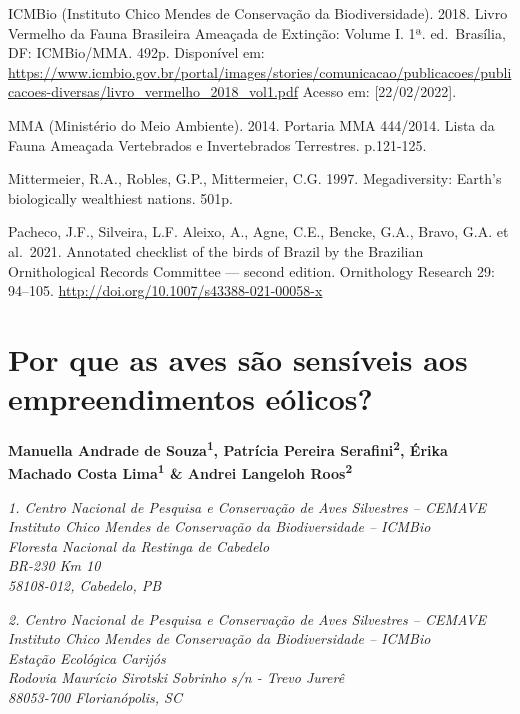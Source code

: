 \documentclass[
  oneside]{scrbook}
\begin{document}
ICMBio (Instituto Chico Mendes de Conservação da Biodiversidade). 2018. Livro Vermelho da Fauna Brasileira Ameaçada de Extinção: Volume I. 1ª. ed.~Brasília, DF: ICMBio/MMA. 492p. Disponível em: \url{https://www.icmbio.gov.br/portal/images/stories/comunicacao/publicacoes/publicacoes-diversas/livro_vermelho_2018_vol1.pdf} Acesso em: {[}22/02/2022{]}.

MMA (Ministério do Meio Ambiente). 2014. Portaria MMA 444/2014. Lista da Fauna Ameaçada Vertebrados e Invertebrados Terrestres. p.121-125.

Mittermeier, R.A., Robles, G.P., Mittermeier, C.G. 1997. Megadiversity: Earth's biologically wealthiest nations. 501p.

Pacheco, J.F., Silveira, L.F. Aleixo, A., Agne, C.E., Bencke, G.A., Bravo, G.A. et al.~2021. Annotated checklist of the birds of Brazil by the Brazilian Ornithological Records Committee --- second edition. Ornithology Research 29: 94--105. \url{http://doi.org/10.1007/s43388-021-00058-x}

\hypertarget{cap4}{%
\chapter{Por que as aves são sensíveis aos empreendimentos eólicos?}\label{cap4}}

\pagestyle{headings}

\textbf{Manuella Andrade de Souza\textsuperscript{1}, Patrícia Pereira Serafini\textsuperscript{2}, Érika Machado Costa Lima\textsuperscript{1} \& Andrei Langeloh Roos\textsuperscript{2}}

\emph{1. Centro Nacional de Pesquisa e Conservação de Aves Silvestres -- CEMAVE}\\
\emph{Instituto Chico Mendes de Conservação da Biodiversidade -- ICMBio}\\
\emph{Floresta Nacional da Restinga de Cabedelo}\\
\emph{BR-230 Km 10}\\
\emph{58108-012, Cabedelo, PB}

\emph{2. Centro Nacional de Pesquisa e Conservação de Aves Silvestres -- CEMAVE}\\
\emph{Instituto Chico Mendes de Conservação da Biodiversidade -- ICMBio}\\
\emph{Estação Ecológica Carijós}\\
\emph{Rodovia Maurício Sirotski Sobrinho s/n - Trevo Jurerê}\\
\emph{88053-700 Florianópolis, SC}
\end{document}
